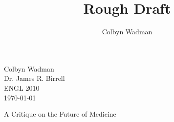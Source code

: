\documentclass{article}
\title{Rough Draft}
\author{Colbyn Wadman}
\begin{document}
\begin{flushleft}

Colbyn Wadman\\
Dr. James R. Birrell\\
ENGL 2010\\
\today\\
\begin{center}
    A Critique on the Future of Medicine
\end{center}

\setlength{\parindent}{0.5in} 





\end{flushleft}
\end{document}
